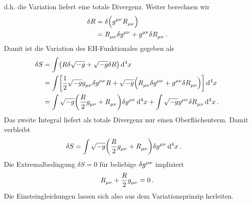 d.h. die Variation liefert eine totale Divergenz.
Weiter berechnen wir
\begin{equation}
\begin{split}
\delta R &=\delta \left(\tensor{g}{^\mu^\nu}\tensor{R}{_\mu_\nu}\right)\\
&=\tensor{R}{_\mu_\nu}\delta\tensor{g}{^\mu^\nu}
+\tensor{g}{^\mu^\nu}\delta\tensor{R}{_\mu_\nu}\,.
\end{split}
\end{equation}
Damit ist die Variation des EH-Funktionales gegeben als
\begin{equation}
\begin{split}
\delta S
&=\int\left(
R\delta\sqrt{-g}+\sqrt{-g}\delta R\right)\dif{}^4x\\
&=\int \left[
\frac{1}{2}\sqrt{-g}\tensor{g}{_\mu_\nu}\delta\tensor{g}{^\mu^\nu}
R+\sqrt{-g}\left(\tensor{R}{_\mu_\nu}\delta\tensor{g}{^\mu^\nu}
+\tensor{g}{^\mu^\nu}\delta\tensor{R}{_\mu_\nu}\right)\right]\dif{}^4x\\
&=\int \sqrt{-g}\left(
\frac{R}{2}\tensor{g}{_\mu_\nu}
+\tensor{R}{_\mu_\nu}\right)\delta\tensor{g}{^\mu^\nu}\dif{}^4x
+\int \sqrt{-g}\tensor{g}{^\mu^\nu}\delta\tensor{R}{_\mu_\nu}\dif{}^4x
\,.
\end{split}
\end{equation}
Das zweite Integral liefert als totale Divergenz nur einen Oberflächenterm.
Damit verbleibt
\begin{equation}
\begin{split}
\delta S
&=\int \sqrt{-g}\left(
\frac{R}{2}\tensor{g}{_\mu_\nu}
+\tensor{R}{_\mu_\nu}\right)\delta\tensor{g}{^\mu^\nu}\dif{}^4x\,.
\end{split}
\end{equation}
Die Extremalbedingung $\delta S=0$ für beliebige $\delta\tensor{g}{^\mu^\nu}$
impliziert
\begin{equation}
\tensor{R}{_\mu_\nu}+\frac{R}{2}\tensor{g}{_\mu_\nu}=0\, .
\end{equation}
Die Einsteingleichungen lassen sich also aus dem Variationsprinzip herleiten.
